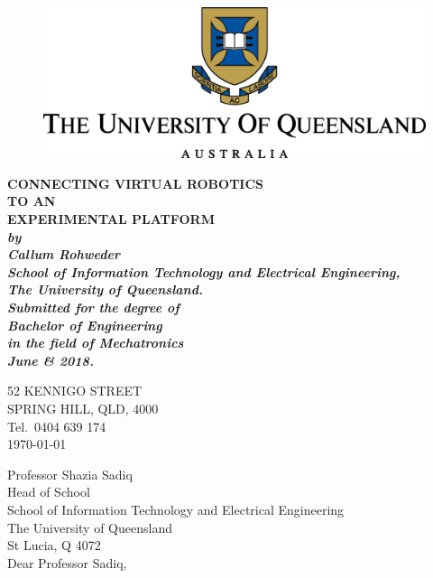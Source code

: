 \documentclass[12pt,openany,a4paper]{book}
\renewcommand{\baselinestretch}{1.2}	%
\begin{document}
\frontmatter

\begin{titlepage}
\renewcommand{\baselinestretch}{1.0}

\begin{center}

\begin{figure}
  \includegraphics[width=\linewidth]{UQLogo.png}
\end{figure}

\vspace*{12mm}
\Huge\bf
		CONNECTING VIRTUAL ROBOTICS\\
		TO AN\\
		EXPERIMENTAL PLATFORM\\
\vspace{20mm}
\large\sl
		by\\
		Callum Rohweder
		\medskip\\
\rm
		School of Information Technology and Electrical Engineering,\\
		The University of Queensland.\\
\vspace{30mm}
		Submitted for the degree of\\
		Bachelor of Engineering
		\smallskip\\
\normalsize
		in the field of Mechatronics
		\medskip\\
\large
		June \& 2018.		
\end{center}
\end{titlepage}

\cleardoublepage

\begin{flushright}
	52 KENNIGO STREET\\
	SPRING HILL, QLD, 4000\\
	Tel.\ 0404 639 174\\
	\medskip
	\today
\end{flushright}
\begin{flushleft}
  Professor Shazia Sadiq\\
  Head of School\\
  School of Information Technology and Electrical Engineering\\
  The University of Queensland\\
  St Lucia, Q 4072\\
  \bigskip\bigskip
  Dear Professor Sadiq,
\end{flushleft}
\end{document}
